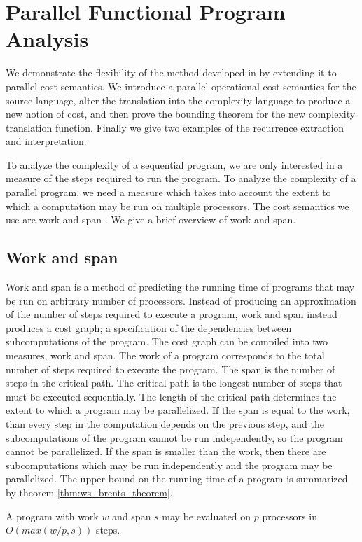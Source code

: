 \chapter{Parallel Functional Program Analysis}

We demonstrate the flexibility of the method developed in \citet{Danner2015} by
extending it to parallel cost semantics. We introduce a parallel operational
cost semantics for the source language, alter the translation into the
complexity language to produce a new notion of cost, and then prove the
bounding theorem for the new complexity translation function.  Finally we give
two examples of the recurrence extraction and interpretation.


To analyze the complexity of a sequential program, we are only interested in a
measure of the steps required to run the program. To analyze the complexity of
a parallel program, we need a measure which takes into account the extent to
which a computation may be run on multiple processors.  The cost semantics we
use are work and span \citet{Harper2012PFPL}.  We give a brief overview of work
and span.


\section{Work and span}
Work and span is a method of predicting the running time of programs that may
be run on arbitrary number of processors. Instead of producing an approximation
of the number of steps required to execute a program, work and span instead
produces a cost graph; a specification of the dependencies between
subcomputations of the program. The cost graph can be compiled into two
measures, work and span. The work of a program corresponds to the total number
of steps required to execute the program.  The span is the number of steps
in the critical path.  The critical path is the longest number of steps that
must be executed sequentially.  The length of the critical path determines the
extent to which a program may be parallelized.  If the span is equal to the
work, than every step in the computation depends on the previous step, and the
subcomputations of the program cannot be run independently, so the program
cannot be parallelized. If the span is smaller than the work, then there are
subcomputations which may be run independently and the program may be
parallelized. The upper bound on the running time of a program is summarized by
theorem \ref{thm:ws_brents_theorem}.

\begin{theorem}
  \label{thm:ws_brents_theorem}
  A program with work $w$ and span $s$ may be evaluated on $p$ processors in $O(max(w/p,s))$ steps.
\end{theorem}

